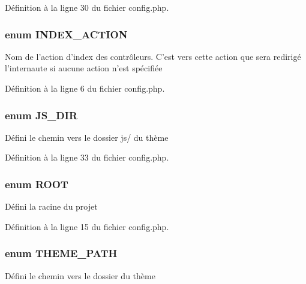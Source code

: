 Définition à la ligne 30 du fichier config.\-php.

\hypertarget{config_8php_a57597912779f7a405b4930ca59fbbb8e}{
\subsubsection[{I\-N\-D\-E\-X\-\_\-\-A\-C\-T\-I\-O\-N}]{\setlength{\rightskip}{0pt plus 5cm}enum {\bf I\-N\-D\-E\-X\-\_\-\-A\-C\-T\-I\-O\-N}}}\label{config_8php_a57597912779f7a405b4930ca59fbbb8e}
Nom de l'action d'index des contrôleurs. C'est vers cette action que sera redirigé l'internaute si aucune action n'est spécifiée 

Définition à la ligne 6 du fichier config.\-php.

\hypertarget{config_8php_a63dff59e90953dccafc9076fdf0b1a70}{
\subsubsection[{J\-S\-\_\-\-D\-I\-R}]{\setlength{\rightskip}{0pt plus 5cm}enum {\bf J\-S\-\_\-\-D\-I\-R}}}\label{config_8php_a63dff59e90953dccafc9076fdf0b1a70}
Défini le chemin vers le dossier js/ du thème 

Définition à la ligne 33 du fichier config.\-php.

\hypertarget{config_8php_a2f226c0dc7872631f02dca304d41628f}{
\subsubsection[{R\-O\-O\-T}]{\setlength{\rightskip}{0pt plus 5cm}enum {\bf R\-O\-O\-T}}}\label{config_8php_a2f226c0dc7872631f02dca304d41628f}
Défini la racine du projet 

Définition à la ligne 15 du fichier config.\-php.

\hypertarget{config_8php_adbfa097c031b87f55b79b857a54302f8}{
\subsubsection[{T\-H\-E\-M\-E\-\_\-\-P\-A\-T\-H}]{\setlength{\rightskip}{0pt plus 5cm}enum {\bf T\-H\-E\-M\-E\-\_\-\-P\-A\-T\-H}}}\label{config_8php_adbfa097c031b87f55b79b857a54302f8}
Défini le chemin vers le dossier du thème 


